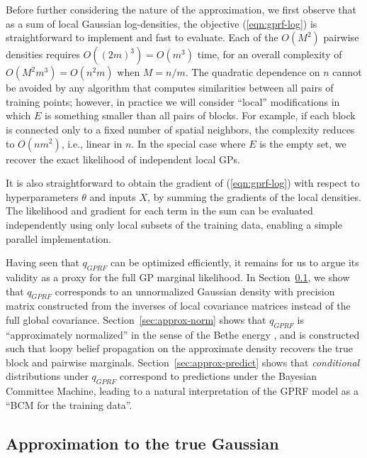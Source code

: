 \documentclass{article}
\begin{document}
Before further considering the nature of the approximation, we first
observe that as a sum of local Gaussian log-densities, the objective (\ref{eqn:gprf-log})
is straightforward to implement and fast to evaluate. Each of the $O(M^2)$
pairwise densities requires $O((2m)^3) = O(m^3)$ time, for an overall complexity of
$O(M^2m^3) = O(n^2m)$ when $M=n/m$. The quadratic dependence on $n$ cannot
be avoided by any algorithm that computes similarities between all
pairs of training points; however, in practice we will consider ``local''
modifications in which $E$ is something smaller than all
pairs of blocks. For example, if each block is connected only to a
fixed number of spatial neighbors, the complexity reduces
to $O(nm^2)$, i.e., linear in $n$. In the special case where $E$ is
the empty set, we recover the exact likelihood of independent local GPs.

It is also straightforward to obtain the gradient of
(\ref{eqn:gprf-log}) with respect to hyperparameters $\theta$ and inputs $X$, by summing
the gradients of the local densities. The likelihood and gradient for each term in the sum
can be evaluated independently using only local subsets of the
training data, enabling a simple parallel implementation. 

Having seen that $q_{GPRF}$ can be optimized efficiently, it remains
for us to argue its validity as a proxy for the full GP marginal
likelihood. In Section~\ref{sec:approx-gaussian}, we show that $q_{GPRF}$ 
corresponds to an unnormalized Gaussian density with precision matrix
constructed from the inverses of local covariance matrices instead of
the full global covariance.  Section~\ref{sec:approx-norm} shows that
$q_{GPRF}$ is ``approximately normalized'' in the sense of the Bethe
energy \cite{yedidia2001bethe}, and is constructed such that loopy belief
propagation on the approximate density recovers the true block and
pairwise marginals. Section~\ref{sec:approx-predict} shows that {\em
  conditional} distributions under $q_{GPRF}$ correspond to
predictions under the Bayesian Committee Machine, leading to a natural
interpretation of the GPRF model as a ``BCM for the training data''.


\subsection{Approximation to the true Gaussian}
\label{sec:approx-gaussian}
\end{document}

